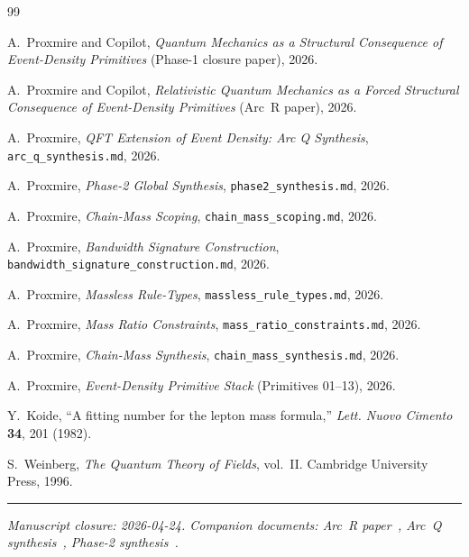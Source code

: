 \documentclass[11pt,a4paper]{article}
\begin{document}
\begin{thebibliography}{99}

A.~Proxmire and Copilot, \emph{Quantum Mechanics as a Structural Consequence of Event-Density Primitives} (Phase-1 closure paper), 2026.

A.~Proxmire and Copilot, \emph{Relativistic Quantum Mechanics as a Forced Structural Consequence of Event-Density Primitives} (Arc~R paper), 2026.

A.~Proxmire, \emph{QFT Extension of Event Density: Arc Q Synthesis}, \texttt{arc\_q\_synthesis.md}, 2026.

A.~Proxmire, \emph{Phase-2 Global Synthesis}, \texttt{phase2\_synthesis.md}, 2026.

A.~Proxmire, \emph{Chain-Mass Scoping}, \texttt{chain\_mass\_scoping.md}, 2026.

A.~Proxmire, \emph{Bandwidth Signature Construction}, \texttt{bandwidth\_signature\_construction.md}, 2026.

A.~Proxmire, \emph{Massless Rule-Types}, \texttt{massless\_rule\_types.md}, 2026.

A.~Proxmire, \emph{Mass Ratio Constraints}, \texttt{mass\_ratio\_constraints.md}, 2026.

A.~Proxmire, \emph{Chain-Mass Synthesis}, \texttt{chain\_mass\_synthesis.md}, 2026.

A.~Proxmire, \emph{Event-Density Primitive Stack} (Primitives 01--13), 2026.

Y.~Koide, ``A fitting number for the lepton mass formula,'' \emph{Lett. Nuovo Cimento} \textbf{34}, 201 (1982).

S.~Weinberg, \emph{The Quantum Theory of Fields}, vol.~II. Cambridge University Press, 1996.

\end{thebibliography}

\vspace{1em}
\noindent\rule{\linewidth}{0.4pt}
\vspace{0.2em}

\noindent\emph{Manuscript closure: 2026-04-24. Companion documents: Arc~R paper~\cite{arcr}, Arc~Q synthesis~\cite{arcq}, Phase-2 synthesis~\cite{phase2syn}.}
\end{document}
